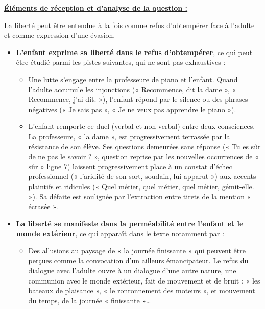 		{\textbf{\underline{Éléments de réception et d’analyse de la question :}}
		
		La liberté peut être entendue à la fois comme refus d’obtempérer face à l’adulte et
comme expression d’une évasion.

\begin{itemize}[label=\textbullet]
\item \textbf{L’enfant exprime sa liberté dans le refus d’obtempérer}, ce qui peut être étudié
parmi les pistes suivantes, qui ne sont pas exhaustives :

\begin{itemize}
\item Une lutte s’engage entre la professeure de piano et l’enfant. Quand l’adulte
accumule les injonctions (« Recommence, dit la dame », « Recommence, j’ai
dit. »), l’enfant répond par le silence ou des phrases négatives (« Je sais pas »,
« Je ne veux pas apprendre le piano »).

\item L’enfant remporte ce duel (verbal et non verbal) entre deux consciences. La
professeure, « la dame », est progressivement terrassée par la résistance de
son élève. Ses questions demeurées sans réponse (« Tu es sûr de ne pas le
savoir ? », question reprise par les nouvelles occurrences de « sûr » ligne 7)
laissent progressivement place à un constat d’échec professionnel (« l’aridité
de son sort, soudain, lui apparut ») aux accents plaintifs et ridicules (« Quel
métier, quel métier, quel métier, gémit-elle. »). Sa défaite est soulignée par
l’extraction entre tirets de la mention « écrasée ».
\end{itemize}

\item \textbf{La liberté se manifeste dans la perméabilité entre l’enfant et le monde extérieur},
ce qui apparaît dans le texte notamment par :
\begin{itemize}
\item Des allusions au paysage de « la journée finissante » qui peuvent être perçues
comme la convocation d’un ailleurs émancipateur. Le refus du dialogue avec
l’adulte ouvre à un dialogue d’une autre nature, une communion avec le monde
extérieur, fait de mouvement et de bruit : « les bateaux de plaisance », « le
ronronnement des moteurs », et mouvement du temps, de la journée
« finissante »…


\end{itemize}
\end{itemize}}
